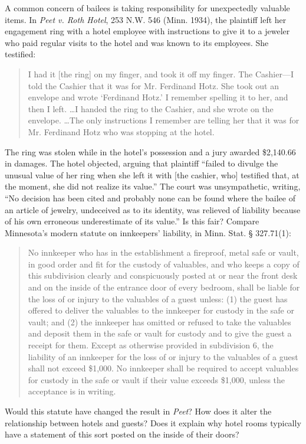 \item A common concern of bailees is taking responsibility for unexpectedly
valuable items. In \textit{Peet v. Roth Hotel}, 253 N.W. 546 (Minn. 1934), the
plaintiff left her engagement ring with a hotel employee with instructions to
give it to a jeweler who paid regular visits to the hotel and was known to its
employees. She testified:
\begin{quote}
I had it [the ring] on my finger, and took it off my finger.  The Cashier---I
told the Cashier that it was for Mr.  Ferdinand Hotz.  She took out an envelope
and wrote `Ferdinand Hotz.' I remember spelling it to her, and then I left. 
\ldots I handed the ring to the Cashier, and she wrote on the envelope.
\ldots The only instructions I remember are telling her that it was for Mr.
Ferdinand Hotz who was stopping at the hotel.
\end{quote}
The ring was stolen while in the hotel's possession and a jury awarded
\$2,140.66 in damages. The hotel objected, arguing that plaintiff ``failed to
divulge the unusual value of her ring when she left it with [the cashier, who]
testified that, at the moment, she did not realize its value.'' The court was
unsympathetic, writing, ``No decision has been cited and probably none can be
found where the bailee of an article of jewelry, undeceived as to its identity,
was relieved of liability because of his own erroneous underestimate of its
value.'' Is this fair? Compare Minnesota's modern statute on innkeepers'
liability, in Minn. Stat. {\S} 327.71(1):
\begin{quote}
No innkeeper who has in the establishment a fireproof, metal safe or vault, in
good order and fit for the custody of valuables, and who keeps a copy of this
subdivision clearly and conspicuously posted at or near the front desk and on
the inside of the entrance door of every bedroom, shall be liable for the loss
of or injury to the valuables of a guest unless: (1) the guest has offered to
deliver the valuables to the innkeeper for custody in the safe or vault; and
(2) the innkeeper has omitted or refused to take the valuables and deposit them
in the safe or vault for custody and to give the guest a receipt for them.
Except as otherwise provided in subdivision 6, the liability of an innkeeper
for the loss of or injury to the valuables of a guest shall not exceed \$1,000.
No innkeeper shall be required to accept valuables for custody in the safe or
vault if their value exceeds \$1,000, unless the acceptance is in writing.
\end{quote}
Would this statute have changed the result in \textit{Peet}? How does it alter
the relationship between hotels and guests? Does it explain why hotel rooms
typically have a statement of this sort posted on the inside of their doors?

